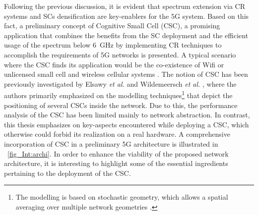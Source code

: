 Following the previous discussion, it is evident that spectrum extension via CR systems and SCs densification are key-enablers for the 5G system.
Based on this fact, a preliminary concept of Cognitive Small Cell (CSC), a promising application that combines the benefits from the SC deployment and the efficient usage of the spectrum below \SI{6}{GHz} by implementing CR techniques to accomplish the requirements of 5G networks is presented. A typical scenario where the CSC finds its application would be the co-existence of Wifi or unlicensed small cell and wireless cellular systems \cite{Benn13, Gali15}. The notion of CSC has been previously investigated by Elsawy \textit{et al.} \cite{Elsawy13, Elsawy13_cmag} and Wildemeersch \textit{et al.} \cite{Wild13}, where the authors primarily emphasized on the modelling techniques\footnote{The modelling is based on stochastic geometry, which allows a spatial averaging over multiple network geometries \cite{Haenggi, Haenggi08now}.} that depict the positioning of several CSCs inside the network. Due to this, the performance analysis of the CSC has been limited mainly to network abstraction. In contrast, this thesis emphasizes on key-aspects encountered while deploying a CSC, which otherwise could forbid its realization on a real hardware. %
 A comprehensive incorporation of CSC in a preliminary 5G architecture is illustrated in \figurename~\ref{fig_Int:archi}. In order to enhance the viability of the proposed network architecture, it is interesting to highlight some of the essential ingredients pertaining to the deployment of the CSC.

